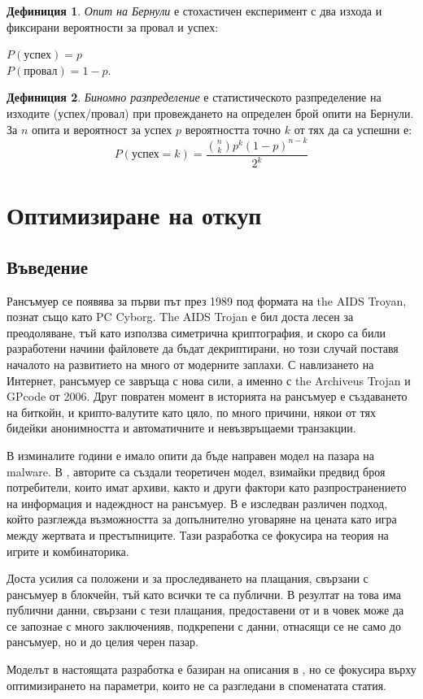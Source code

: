 \documentclass[11pt, a4paper]{article}
\theoremstyle{definition}
\newtheorem{definition}{Дефиниция}
\begin{document}
		\begin{definition}
			\label{def:Bernoulli_trial}
			\emph{Опит на Бернули} е стохастичен експеримент с два изхода и фиксирани вероятности за провал и успех:
			\begin{center}
				$P(\text{успех})=p$\\
				$P(\text{провал})=1-p.$
			\end{center}
		\end{definition}
		
		\begin{definition}
			\label{def:Binomial_distribution}
			\emph{Биномно разпределение} е статистическото разпределение на изходите (успех/провал) при провеждането на определен брой опити на Бернули.
			За $n$ опита и вероятност за успех $p$ вероятността точно $k$ от тях да са успешни е:
			$$
			P(\text{успех} = k) = \frac{\binom{n}{k}p^{k}(1-p)^{n-k}}{2^k}
			$$
		\end{definition}
		\newpage

	\section{Оптимизиране на откуп}		
		\subsection{Въведение}
			Рансъмуер се появява за първи път през 1989 под формата на the AIDS Troyan, познат също като PC Cyborg.  The AIDS Trojan е бил доста лесен за преодоляване, тъй като използва симетрична криптография, и скоро са били разработени начини файловете да бъдат декриптирани, но този случай поставя началото на развитието на много от модерните заплахи. С навлизането на Интернет, рансъмуер се завръща с нова сили, а именно с the Archiveus Trojan и GPcode от 2006. Друг повратен момент в историята на рансъмуер е създаването на биткойн, и крипто-валутите като цяло, по много причини, някои от тях бидейки анонимността и автоматичните и невъзвръщаеми транзакции\cite{huang2018tracking}.\par
			В изминалите години е имало опити да бъде направен модел на пазара на malware. В \cite{caulfielddynamic}, авторите са създали теоретичен модел, взимайки предвид броя потребители, които имат архиви, както и други фактори като разпространението на информация и надеждност на рансъмуер.           
			В \cite{cartwright2018pay} е изследван различен подход, който разглежда възможността за допълнително уговаряне на цената като игра между жертвата и престъпниците. Тази разработка се фокусира на теория на игрите и комбинаторика.\par
			Доста усилия са положени и за проследяването на плащания, свързани с рансъмуер в блокчейн, тъй като всички те са публични. В резултат на това има публични данни, свързани с тези плащания, предоставени от \cite{paquet2019ransomware} и в \cite{thomas2015framing} човек може да се запознае с много заключенияв, подкрепени с данни, отнасящи се не само до рансъмуер, но и до целия черен пазар.\par
			Моделът в настоящата разработка е базиран на описания в \cite{caulfielddynamic}, но се фокусира върху оптимизирането на параметри, които не са разгледани в споменатата статия.
\end{document}
